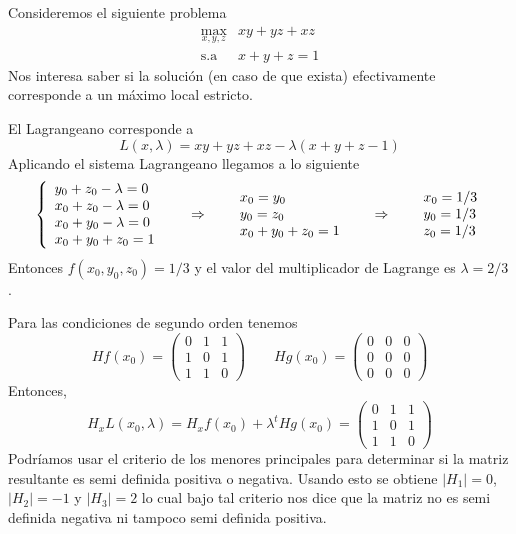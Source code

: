 \begin{ejemplo}
Consideremos el siguiente problema
$$
\begin{array}{cc}
\displaystyle \max_{x,y,z}  & xy + yz + xz  \\
\text{s.a}  		   		& x+y+z = 1 
\end{array}
$$
Nos interesa saber si la soluci\'on (en caso de que exista) efectivamente corresponde a un m\'aximo local estricto.
\end{ejemplo}

\begin{solucion}
El Lagrangeano corresponde a
$$L(x,\lambda)=xy + yz + xz - \lambda(x+y+z-1)$$
Aplicando el sistema Lagrangeano llegamos a lo siguiente
\[%
\begin{array}
[c]{lllll}%
\left\{
\begin{array}
[c]{l}%
y_0+z_0 - \lambda = 0 \\
x_0+z_0 - \lambda = 0 \\
x_0+y_0 - \lambda = 0 \\
x_0+y_0+z_0 = 1
\end{array}
\right.   & \quad\Rightarrow\quad &
\begin{array}
[c]{l}%
x_0=y_0\\
y_0=z_0 \\
x_0+y_0+z_0 = 1
\end{array}
& \quad\Rightarrow\quad &
\begin{array}
[c]{l}%
x_0= 1/3 \\
y_0= 1/3 \\
z_0= 1/3 \\
\end{array}
\end{array}
\]
Entonces $f(x_0,y_0,z_0)=1/3$ y el valor del multiplicador de Lagrange es $\lambda = 2/3$.
 
Para las condiciones de segundo orden tenemos
$$
Hf(x_0)=\begin{pmatrix}
0 & 1 & 1 \\
1 & 0 & 1 \\
1 & 1 & 0
\end{pmatrix} \qquad
Hg(x_0)=\begin{pmatrix}
0 & 0 & 0 \\
0 & 0 & 0 \\
0 & 0 & 0
\end{pmatrix}
$$
Entonces,
$$
H_xL(x_0,\lambda)=H_x f(x_0) + \lambda^t Hg(x_0) = \begin{pmatrix}
0 & 1 & 1 \\
1 & 0 & 1 \\
1 & 1 & 0
\end{pmatrix}
$$
Podr\'iamos usar el criterio de los menores principales para determinar si la matriz resultante es semi definida positiva o negativa. Usando esto se obtiene $|H_1|=0$, $|H_2|=-1$ y $|H_3|=2$ lo cual bajo tal criterio nos dice que la matriz no es semi definida negativa ni tampoco semi definida positiva.


\end{solucion}
